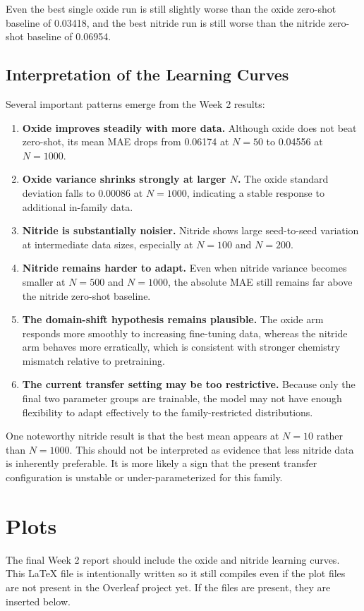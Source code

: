 \documentclass[11pt]{article}
\begin{document}
Even the best single oxide run is still slightly worse than the oxide zero-shot baseline of 0.03418, and the best nitride run is still worse than the nitride zero-shot baseline of 0.06954.

\subsection{Interpretation of the Learning Curves}
Several important patterns emerge from the Week 2 results:
\begin{enumerate}
  \item \textbf{Oxide improves steadily with more data.} Although oxide does not beat zero-shot, its mean MAE drops from 0.06174 at $N=50$ to 0.04556 at $N=1000$.
  \item \textbf{Oxide variance shrinks strongly at larger $N$.} The oxide standard deviation falls to 0.00086 at $N=1000$, indicating a stable response to additional in-family data.
  \item \textbf{Nitride is substantially noisier.} Nitride shows large seed-to-seed variation at intermediate data sizes, especially at $N=100$ and $N=200$.
  \item \textbf{Nitride remains harder to adapt.} Even when nitride variance becomes smaller at $N=500$ and $N=1000$, the absolute MAE still remains far above the nitride zero-shot baseline.
  \item \textbf{The domain-shift hypothesis remains plausible.} The oxide arm responds more smoothly to increasing fine-tuning data, whereas the nitride arm behaves more erratically, which is consistent with stronger chemistry mismatch relative to pretraining.
  \item \textbf{The current transfer setting may be too restrictive.} Because only the final two parameter groups are trainable, the model may not have enough flexibility to adapt effectively to the family-restricted distributions.
\end{enumerate}

One noteworthy nitride result is that the best mean appears at $N=10$ rather than $N=1000$.
This should not be interpreted as evidence that less nitride data is inherently preferable.
It is more likely a sign that the present transfer configuration is unstable or under-parameterized for this family.

\section{Plots}
The final Week 2 report should include the oxide and nitride learning curves.
This LaTeX file is intentionally written so it still compiles even if the plot files are not present in the Overleaf project yet.
If the files are present, they are inserted below.
\end{document}
